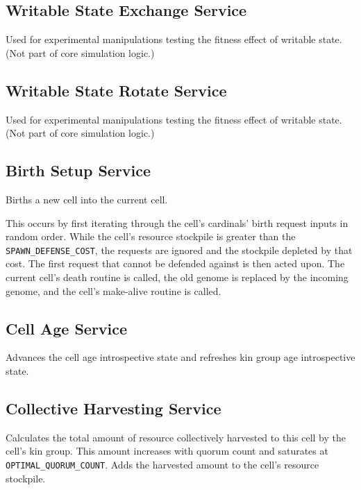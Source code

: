 \subsection{Writable State Exchange Service}


Used for experimental manipulations testing the fitness effect of writable state.
(Not part of core simulation logic.)

\subsection{Writable State Rotate Service}


Used for experimental manipulations testing the fitness effect of writable state.
(Not part of core simulation logic.)

\subsection{Birth Setup Service}


Births a new cell into the current cell.

This occurs by first iterating through the cell's cardinals' birth request inputs in random order.
While the cell's resource stockpile is greater than the \texttt{SPAWN\_DEFENSE\_COST}, the requests are ignored and the stockpile depleted by that cost.
The first request that cannot be defended against is then acted upon.
The current cell's death routine is called, the old genome is replaced by the incoming genome, and the cell's make-alive routine is called.

\subsection{Cell Age Service}


Advances the cell age introspective state and refreshes kin group age introspective state.

\subsection{Collective Harvesting Service}


Calculates the total amount of resource collectively harvested to this cell by the cell's kin group.
This amount increases with quorum count and saturates at \texttt{OPTIMAL\_QUORUM\_COUNT}.
Adds the harvested amount to the cell's resource stockpile.

